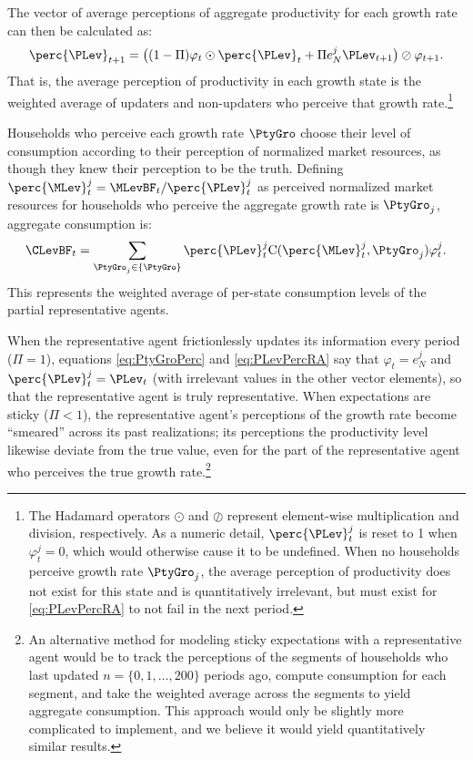 The vector of average perceptions of aggregate productivity for each growth
rate can then be calculated as:
\begin{equation}\label{eq:PLevPercRA}
\perc{\PLev}_{t+1} = \big((1 - \Pi) \varphi_{t} \odot \perc{\PLev}_t + \Pi e_N^j \PLev_{t+1} \big) \oslash \varphi_{t+1}.
\end{equation}
That is, the average perception of productivity in each growth state is the weighted
average of updaters and non-updaters who perceive that growth rate.\footnote{The
Hadamard operators $\odot$ and $\oslash$ represent element-wise multiplication and
division, respectively. As a numeric detail, $\perc{\PLev}_t^j$ is reset to 1 when $\varphi_t^j=0$,
which would otherwise cause it to be undefined.  When no households perceive growth
rate $\PtyGro_j$, the average perception of productivity does not exist for this state and is quantitatively
irrelevant, but must exist for \eqref{eq:PLevPercRA} to not fail in the next period.}

Households who perceive each growth rate $\PtyGro$ choose their level of consumption according to their perception of normalized market resources, as though they knew their perception to be the truth.  Defining $\perc{\MLev}_t^j = \MLevBF_t/\perc{\PLev}_t^j$ as perceived normalized market resources for households who perceive the aggregate growth rate is $\PtyGro_j$, aggregate consumption is:
\begin{equation}\label{eq:cLvlRA}
\CLevBF_t = \sum_{\PtyGro_j \in \{\PtyGro\}} \perc{\PLev}_t^j \text{C}(\perc{\MLev}_t^j,\PtyGro_j) \varphi_t^j.
\end{equation}
This represents the weighted average of per-state consumption levels of the partial
representative agents.

When the representative agent frictionlessly updates its information every period ($\Pi=1$),
equations \eqref{eq:PtyGroPerc} and \eqref{eq:PLevPercRA} say that $\varphi_t = e_N^j$
and $\perc{\PLev}_t^j = \PLev_t$ (with irrelevant values in the other vector elements), so
that the representative agent is truly representative.  When expectations are sticky ($\Pi < 1$),
the representative agent's perceptions of the growth rate become ``smeared'' across its
past realizations; its perceptions the productivity level likewise deviate from the true value,
even for the part of the representative agent who perceives the true growth rate.\footnote{An alternative method for modeling sticky expectations with a representative agent would be to track the
perceptions of the segments of households who last updated $n=\{0,1,\ldots,200\}$
periods ago, compute consumption for each segment, and take the weighted average
across the segments to yield aggregate consumption.  This approach would only be
slightly more complicated to implement, and we believe it would yield quantitatively
similar results.}

